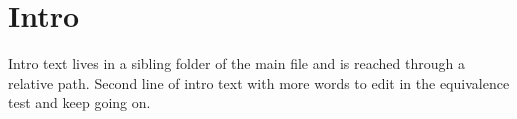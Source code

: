 \section{Intro}\label{sec:intro}
Intro text lives in a sibling folder of the main file and is reached through a relative path.
Second line of intro text with more words to edit in the equivalence test and keep going on.

